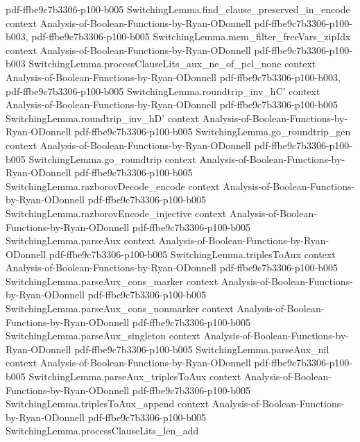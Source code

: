 \begin{theorem}
{    pdf-ffbe9c7b3306-p100-b005}
\proofstep
  {SwitchingLemma.find_clause_preserved_in_encode}
  {context}
  {Analysis-of-Boolean-Functions-by-Ryan-ODonnell}
  {pdf-ffbe9c7b3306-p100-b003,
    pdf-ffbe9c7b3306-p100-b005}
\proofstep
  {SwitchingLemma.mem_filter_freeVars_zipIdx}
  {context}
  {Analysis-of-Boolean-Functions-by-Ryan-ODonnell}
  {pdf-ffbe9c7b3306-p100-b003}
\proofstep
  {SwitchingLemma.processClauseLits_aux_ne_of_pcl_none}
  {context}
  {Analysis-of-Boolean-Functions-by-Ryan-ODonnell}
  {pdf-ffbe9c7b3306-p100-b003,
    pdf-ffbe9c7b3306-p100-b005}
\proofstep
  {SwitchingLemma.roundtrip_inv_hC'}
  {context}
  {Analysis-of-Boolean-Functions-by-Ryan-ODonnell}
  {pdf-ffbe9c7b3306-p100-b005}
\proofstep
  {SwitchingLemma.roundtrip_inv_hD'}
  {context}
  {Analysis-of-Boolean-Functions-by-Ryan-ODonnell}
  {pdf-ffbe9c7b3306-p100-b005}
\proofstep
  {SwitchingLemma.go_roundtrip_gen}
  {context}
  {Analysis-of-Boolean-Functions-by-Ryan-ODonnell}
  {pdf-ffbe9c7b3306-p100-b005}
\proofstep
  {SwitchingLemma.go_roundtrip}
  {context}
  {Analysis-of-Boolean-Functions-by-Ryan-ODonnell}
  {pdf-ffbe9c7b3306-p100-b005}
\proofstep
  {SwitchingLemma.razborovDecode_encode}
  {context}
  {Analysis-of-Boolean-Functions-by-Ryan-ODonnell}
  {pdf-ffbe9c7b3306-p100-b005}
\proofstep
  {SwitchingLemma.razborovEncode_injective}
  {context}
  {Analysis-of-Boolean-Functions-by-Ryan-ODonnell}
  {pdf-ffbe9c7b3306-p100-b005}
\proofstep
  {SwitchingLemma.parseAux}
  {context}
  {Analysis-of-Boolean-Functions-by-Ryan-ODonnell}
  {pdf-ffbe9c7b3306-p100-b005}
\proofstep
  {SwitchingLemma.triplesToAux}
  {context}
  {Analysis-of-Boolean-Functions-by-Ryan-ODonnell}
  {pdf-ffbe9c7b3306-p100-b005}
\proofstep
  {SwitchingLemma.parseAux_cons_marker}
  {context}
  {Analysis-of-Boolean-Functions-by-Ryan-ODonnell}
  {pdf-ffbe9c7b3306-p100-b005}
\proofstep
  {SwitchingLemma.parseAux_cons_nonmarker}
  {context}
  {Analysis-of-Boolean-Functions-by-Ryan-ODonnell}
  {pdf-ffbe9c7b3306-p100-b005}
\proofstep
  {SwitchingLemma.parseAux_singleton}
  {context}
  {Analysis-of-Boolean-Functions-by-Ryan-ODonnell}
  {pdf-ffbe9c7b3306-p100-b005}
\proofstep
  {SwitchingLemma.parseAux_nil}
  {context}
  {Analysis-of-Boolean-Functions-by-Ryan-ODonnell}
  {pdf-ffbe9c7b3306-p100-b005}
\proofstep
  {SwitchingLemma.parseAux_triplesToAux}
  {context}
  {Analysis-of-Boolean-Functions-by-Ryan-ODonnell}
  {pdf-ffbe9c7b3306-p100-b005}
\proofstep
  {SwitchingLemma.triplesToAux_append}
  {context}
  {Analysis-of-Boolean-Functions-by-Ryan-ODonnell}
  {pdf-ffbe9c7b3306-p100-b005}
\proofstep
  {SwitchingLemma.processClauseLits_len_add}

\end{theorem}
